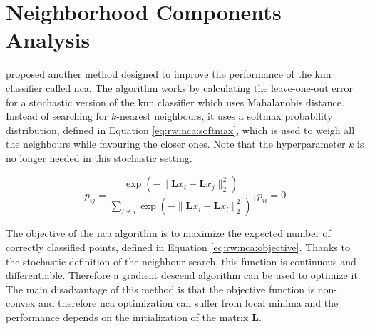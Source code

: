 \documentclass[12pt,a4paper]{report}
\begin{document}





\section{Neighborhood Components Analysis} \label{chap:rw:nca}
\citep{jacobgoldberger2004neighbourhood} proposed another method designed to improve the performance of the \ac{knn} classifier called \acf{nca}. The algorithm works by calculating the leave-one-out error for a stochastic version of the \ac{knn} classifier which uses Mahalanobis distance. Instead of searching for $k$-nearest neighbours, it uses a softmax probability distribution, defined in Equation \ref{eq:rw:nca:softmax}, which is used to weigh all the neighbours while favouring the closer ones. Note that the hyperparameter $k$ is no longer needed in this stochastic setting.

\begin{equation}
p_{ij} = \frac{ \exp(-\lVert \bm{L}x_i-\bm{L}x_j \rVert_2^2) }{ \sum_{l \neq i} \exp(-\lVert \bm{L}x_i-\bm{L}x_l \rVert_2^2) }, p_{ii}=0 \label{eq:rw:nca:softmax}
\end{equation}

The objective of the \ac{nca} algorithm is to maximize the expected number of correctly classified points, defined in Equation \ref{eq:rw:nca:objective}. Thanks to the stochastic definition of the neighbour search, this function is continuous and differentiable. Therefore a gradient descend algorithm can be used to optimize it. The main disadvantage of this method is that the objective function is non-convex and therefore \ac{nca} optimization can suffer from local minima and the performance depends on the initialization of the matrix $\bm{L}$. 
\end{document}
